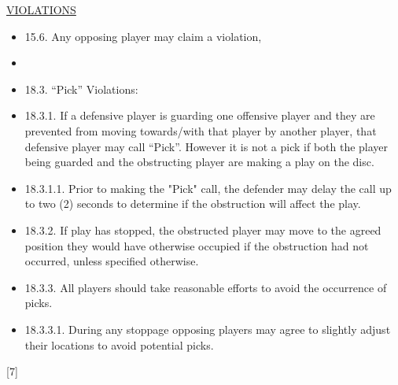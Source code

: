 \begin{center}\underline{\uppercase{violations}}\end{center}
\begin{itemize}

    \item 15.6. Any opposing player may claim a violation,
    \item 
    \item 18.3. “Pick” Violations:
    \item 18.3.1. If a defensive player is guarding one offensive player and they are prevented from moving towards/with that player by another player, that defensive player may call “Pick”. However it is not a pick if both the player being guarded and the obstructing player are making a play on the disc.
    \item 18.3.1.1. Prior to making the "Pick" call, the defender may delay the call up to two (2) seconds to determine if the obstruction will affect the play.
    \item 18.3.2. If play has stopped, the obstructed player may move to the agreed position they would have otherwise occupied if the obstruction had not occurred, unless specified otherwise.
    \item 18.3.3. All players should take reasonable efforts to avoid the occurrence of picks.
    \item 18.3.3.1. During any stoppage opposing players may agree to slightly adjust their locations to avoid potential picks.
\end{itemize}
\begin{center}[7]\end{center}


